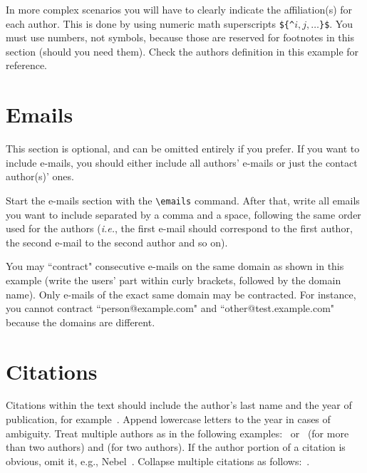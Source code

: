 \documentclass{article}
\begin{document}
In more complex scenarios you will have to clearly indicate the affiliation(s) for each author. This is done by using numeric math superscripts {\tt \$\{\^{}$i,j, \ldots$\}\$}. You must use numbers, not symbols, because those are reserved for footnotes in this section (should you need them). Check the authors definition in this example for reference.

\section{Emails}

This section is optional, and can be omitted entirely if you prefer. If you want to include e-mails, you should either include all authors' e-mails or just the contact author(s)' ones.

Start the e-mails section with the {\tt \textbackslash{}emails} command. After that, write all emails you want to include separated by a comma and a space, following the same order used for the authors (\emph{i.e.}, the first e-mail should correspond to the first author, the second e-mail to the second author and so on).

You may ``contract" consecutive e-mails on the same domain as shown in this example (write the users' part within curly brackets, followed by the domain name). Only e-mails of the exact same domain may be contracted. For instance, you cannot contract ``person@example.com" and ``other@test.example.com" because the domains are different.


\section{Citations}

Citations within the text should include the author's last name and
the year of publication, for example~\cite{gottlob:nonmon}.  Append
lowercase letters to the year in cases of ambiguity.  Treat multiple
authors as in the following examples:~\cite{abelson-et-al:scheme}
or~\cite{bgf:Lixto} (for more than two authors) and
\cite{brachman-schmolze:kl-one} (for two authors).  If the author
portion of a citation is obvious, omit it, e.g.,
Nebel~.  Collapse multiple citations as
follows:~\cite{gls:hypertrees,levesque:functional-foundations}.
\nocite{abelson-et-al:scheme}
\nocite{bgf:Lixto}
\nocite{brachman-schmolze:kl-one}
\nocite{gottlob:nonmon}
\nocite{gls:hypertrees}
\nocite{levesque:functional-foundations}
\nocite{levesque:belief}
\nocite{nebel:jair-2000}
\end{document}
